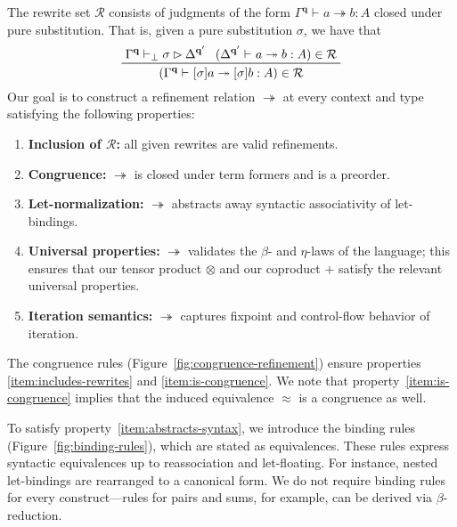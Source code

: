 \documentclass[acmsmall,screen,review]{acmart}
\newcommand{\mc}[1]{\ensuremath{\mathcal{#1}}}
\newcommand{\mb}[1]{\ensuremath{\mathbf{#1}}}
\newcommand{\issubst}[4]{#1 \vdash_{#2} #3 \rhd #4}
\newcommand{\tref}{\twoheadrightarrow}
\newcommand{\tmle}[5]{#1 \vdash_{#2} #3 \tref #4 : {#5}}
\begin{document}
The rewrite set $\mc{R}$ consists of judgments of the form $\tmle{\Gamma^{\mb{q}}}{}{a}{b}{A}$
closed under pure substitution. That is, given a pure substitution $\sigma$, we have that
\begin{equation*}
  \prftree[r]{}
    {\issubst{\Gamma^{\mb{q}}}{\bot}{\sigma}{\Delta^{\mb{q}'}}}
    {(\tmle{\Delta^{\mb{q}'}}{}{a}{b}{A}) \in \mc{R}}
    {(\tmle{\Gamma^{\mb{q}}}{}{[\sigma]a}{[\sigma]b}{A}) \in \mc{R}} 
\end{equation*}
Our goal is to construct a refinement relation $\tref$ at every context and type satisfying the
following properties: 
\begin{enumerate}
  \item \textbf{Inclusion of $\mc{R}$:} all given rewrites are valid refinements.
  \label{item:includes-rewrites}
  \item \textbf{Congruence:} $\tref$ is closed under term formers and is a preorder.
  \label{item:is-congruence}
  \item \textbf{Let-normalization:} $\tref$ abstracts away syntactic associativity of let-bindings.
  \label{item:abstracts-syntax}
  \item \textbf{Universal properties:} $\tref$ validates the $\beta$- and $\eta$-laws of the
  language; this ensures that our tensor product $\otimes$ and our coproduct $+$ satisfy the
  relevant universal properties.
  \label{item:does-computation}
  \item \textbf{Iteration semantics:} $\tref$ captures fixpoint and control-flow behavior of
  iteration.
  \label{item:does-iteration}
\end{enumerate}
The congruence rules (Figure~\ref{fig:congruence-refinement}) ensure properties
\ref{item:includes-rewrites} and \ref{item:is-congruence}. We note that
property~\ref{item:is-congruence} implies that the induced equivalence $\approx$ is a
congruence as well.

To satisfy property~\ref{item:abstracts-syntax}, we introduce the binding rules
(Figure~\ref{fig:binding-rules}), which are stated as equivalences. These rules express syntactic
equivalences up to reassociation and let-floating. For instance, nested let-bindings are rearranged
to a canonical form. We do not require binding rules for every construct—rules for pairs and sums,
for example, can be derived via $\beta$-reduction.
\end{document}
